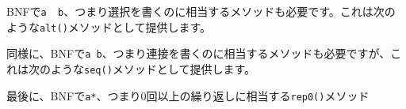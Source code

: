 BNFで\texttt{a\ \textbar{}\ b}、つまり選択を書くのに相当するメソッドも必要です。これは次のような\texttt{alt()}メソッドとして提供します。

\begin{Shaded}
\begin{Highlighting}[]
\NormalTok{ (} \NormalTok{\textless{}}\NormalTok{\textgreater{}(}\NormalTok{, }\NormalTok{(}
    \NormalTok{(}\NormalTok{(}\NormalTok{), }\NormalTok{(}\NormalTok{(}\NormalTok{)}
\NormalTok{);}
\end{Highlighting}
\end{Shaded}

同様に、BNFで\texttt{a\ b}、つまり連接を書くのに相当するメソッドも必要ですが、これは次のような\texttt{seq()}メソッドとして提供します。

\begin{Shaded}
\begin{Highlighting}[]
\NormalTok{ (} \NormalTok{\textless{}\textgreater{}(}\NormalTok{, }\NormalTok{), }\NormalTok{(}
    \NormalTok{(}\NormalTok{(}\NormalTok{), }\NormalTok{(}\NormalTok{(}\NormalTok{)}
\NormalTok{);}
\end{Highlighting}
\end{Shaded}

最後に、BNFで\texttt{a*}、つまり0回以上の繰り返しに相当する\texttt{rep0()}メソッド

\begin{Shaded}
\begin{Highlighting}[]
\end{Highlighting}
\end{Shaded}


